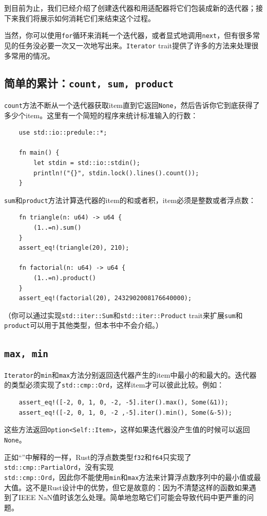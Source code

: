 到目前为止，我们已经介绍了创建迭代器和用适配器将它们包装成新的迭代器；接下来我们将展示如何消耗它们来结束这个过程。

当然，你可以使用\texttt{for}循环来消耗一个迭代器，或者显式地调用\texttt{next}，但有很多常见的任务没必要一次又一次地写出来。\texttt{Iterator} trait提供了许多的方法来处理很多常用的情况。

\subsection{简单的累计：\texttt{count, sum, product}}
\texttt{count}方法不断从一个迭代器获取item直到它返回\texttt{None}，然后告诉你它到底获得了多少个item。这里有一个简短的程序来统计标准输入的行数：
\begin{verbatim}
    use std::io::predule::*;

    fn main() {
        let stdin = std::io::stdin();
        println!("{}", stdin.lock().lines().count());
    }
\end{verbatim}

\texttt{sum}和\texttt{product}方法计算迭代器的item的和或者积，item必须是整数或者浮点数：
\begin{verbatim}
    fn triangle(n: u64) -> u64 {
        (1..=n).sum()
    }
    assert_eq!(triangle(20), 210);

    fn factorial(n: u64) -> u64 {
        (1..=n).product()
    }
    assert_eq!(factorial(20), 2432902008176640000);
\end{verbatim}

（你可以通过实现\texttt{std::iter::Sum}和\texttt{std::iter::Product} trait来扩展\texttt{sum}和\texttt{product}可以用于其他类型，但本书中不会介绍。）

\subsection{\texttt{max, min}}
\texttt{Iterator}的\texttt{min}和\texttt{max}方法分别返回迭代器产生的item中最小的和最大的。迭代器的类型必须实现了\texttt{std::cmp::Ord}，这样item才可以彼此比较。例如：
\begin{verbatim}
    assert_eq!([-2, 0, 1, 0, -2, -5].iter().max(), Some(&1));
    assert_eq!([-2, 0, 1, 0, -2 ,-5].iter().min(), Some(&-5));
\end{verbatim}

这些方法返回\texttt{Option<Self::Item>}，这样如果迭代器没产生值的时候可以返回\texttt{None}。

正如“”中解释的一样，Rust的浮点数类型\texttt{f32}和\texttt{f64}只实现了\texttt{std::cmp::PartialOrd}，没有实现\\
\texttt{std::cmp::Ord}，因此你不能使用\texttt{min}和\texttt{max}方法来计算浮点数序列中的最小值或最大值。这不是Rust设计中的优势，但它是故意的：因为不清楚这样的函数如果遇到了IEEE NaN值时该怎么处理。简单地忽略它们可能会导致代码中更严重的问题。


